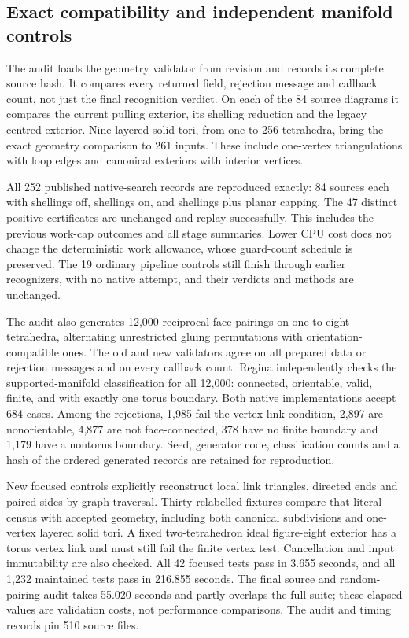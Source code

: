 \subsection{Exact compatibility and independent manifold controls}

The audit loads the geometry validator from revision  and
records its complete source hash. It compares every returned field, rejection
message and callback count, not just the final recognition verdict. On each
of the 84 source diagrams it compares the current pulling exterior, its
shelling reduction and the legacy centred exterior. Nine layered solid tori,
from one to 256 tetrahedra, bring the exact geometry comparison to 261 inputs.
These include one-vertex triangulations with loop edges and canonical
exteriors with interior vertices.

All 252 published native-search records are reproduced exactly: 84 sources
each with shellings off, shellings on, and shellings plus planar capping.
The 47 distinct positive certificates are unchanged and replay successfully.
This includes the previous work-cap outcomes and all stage summaries. Lower
CPU cost does not change the deterministic work allowance, whose guard-count
schedule is preserved. The 19 ordinary pipeline controls still finish through
earlier recognizers, with no native attempt, and their verdicts and methods
are unchanged.

The audit also generates 12,000 reciprocal face pairings on one to eight
tetrahedra, alternating unrestricted gluing permutations with orientation-
compatible ones. The old and new validators agree on all prepared data or
rejection messages and on every callback count. Regina independently checks
the supported-manifold classification for all 12,000: connected, orientable,
valid, finite, and with exactly one torus boundary. Both native implementations
accept 684 cases. Among the rejections, 1,985 fail the vertex-link condition,
2,897 are nonorientable, 4,877 are not face-connected, 378 have no finite
boundary and 1,179 have a nontorus boundary. Seed, generator code, classification
counts and a hash of the ordered generated records are retained for reproduction.

New focused controls explicitly reconstruct local link triangles, directed
ends and paired sides by graph traversal. Thirty relabelled fixtures compare
that literal census with accepted geometry, including both canonical
subdivisions and one-vertex layered solid tori. A fixed two-tetrahedron ideal
figure-eight exterior has a torus vertex link and must still fail the finite
vertex test. Cancellation and input immutability are also checked. All 42
focused tests pass in 3.655 seconds, and all 1,232 maintained tests pass in
216.855 seconds. The final source and random-pairing audit takes 55.020 seconds
and partly overlaps the full suite; these elapsed values are validation costs,
not performance comparisons. The audit and timing records pin 510 source files.


